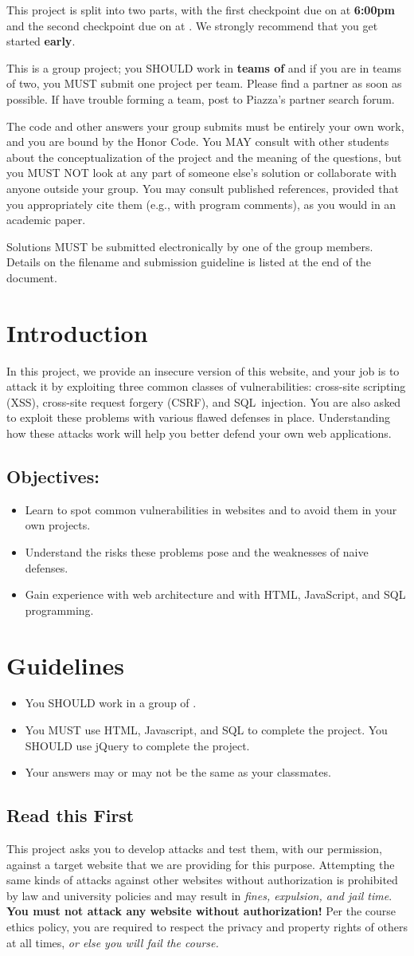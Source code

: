 \documentclass[letterpaper,12pt]{report}
\newcommand{\htitle}
{
     \noindent\parbox{\textwidth}
    {
        \course\hfill \distdate\newline
        \coursename\hfill 
        \settitle \vspace*{-.5ex}\newline
        \mbox{}\hrulefill\mbox{}
    }
    \vspace{8pt}
    \begin{center}{\Large\bf{\settitle}}\end{center}
}
\newcommand{\handout}
{
    \thispagestyle{empty}
    \markboth{}{}
    \pagestyle{plain}
    \htitle
}
\newcommand{\problemsetheader}
{
\setlength{\parindent}{0pt}

This project is split into two parts, with the first checkpoint due on {\bf \checkpointduedate} at {\bf 6:00pm} and the second checkpoint due on {\bf \duedate} at {\bf \duetime}. We strongly recommend that you get started {\bf early}. 
\medskip

This is a group project; you SHOULD work in \textbf{teams of \numberingroup} and if you are in teams of two, you MUST submit one project per team.  Please find a partner as soon as possible.  If have trouble forming a team, post to Piazza's partner search forum.

\medskip

The code and other answers your group submits must be entirely your own work, and you are bound by the Honor Code.  You MAY consult with other students about the conceptualization of the project and the meaning of the questions, but you MUST NOT look at any part of someone else's solution or collaborate with anyone outside your group.  You may consult published references, provided that you appropriately cite them (e.g., with program comments), as you would in an academic paper.

\medskip

Solutions MUST be submitted electronically by one of the group members. Details on the filename and submission guideline is listed at the end of the document.

\medskip

\hrulefill

\medskip

}
\begin{document}
\handout
\problemsetheader


\vspace{-6pt}
\section*{Introduction}
In this project, we provide an insecure version of this website, and your job is to attack it by exploiting three common classes of vulnerabilities: cross-site scripting (XSS), cross-site request forgery (CSRF), and SQL~injection. You are also asked to exploit these problems with various flawed defenses in place. Understanding how these attacks work will help you better defend your own web applications.\newline

\subsection*{Objectives:}

\begin{itemize}
\item Learn to spot common vulnerabilities in websites and to avoid them in your own projects.
\item Understand the risks these problems pose and the weaknesses of naive defenses.
\item Gain experience with web architecture and with HTML, JavaScript, and SQL programming.
\end{itemize}

\section*{Guidelines}
\begin{itemize}
\item You SHOULD work in a group of \numberingroup.
\item You MUST use HTML, Javascript, and SQL to complete the project. You SHOULD use jQuery to complete the project.
\item Your answers may or may not be the same as your classmates.
\end{itemize}

\smallskip

\subsection*{Read this First}

This project asks you to develop attacks and test them, with our permission, against a target website that we are providing for this purpose.  Attempting the same kinds of attacks against other websites without authorization is prohibited by law and university policies and may result in \emph{fines, expulsion, and jail time}.   \textbf{You must not attack any website without authorization!}  Per the course ethics policy, you are required to respect the privacy and  property rights of others at all times, \emph{or else you will fail the course.}  
\end{document}
